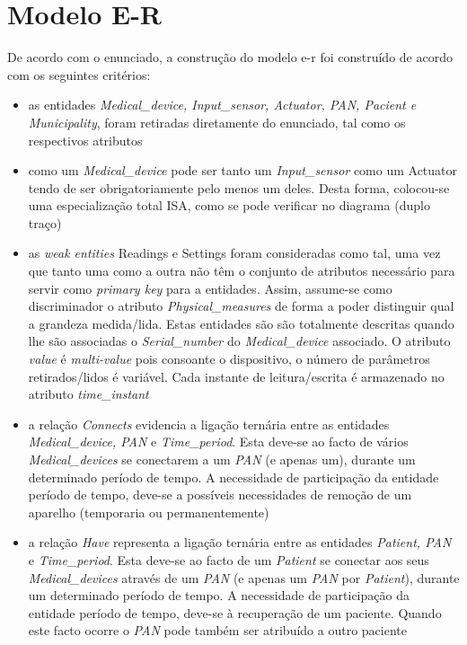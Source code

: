 \documentclass[a4paper]{article}
\begin{document}


\tableofcontents
{}
\pagebreak
{}
\section{Modelo E-R}
De acordo com o enunciado, a construção do modelo e-r foi construído de acordo com os seguintes critérios:
\begin{itemize}

	\item as entidades \textit{Medical\_device, Input\_sensor, Actuator, 
	PAN, Pacient e Municipality}, foram retiradas diretamente do enunciado, tal como os respectivos atributos
	
	\item como um \textit{Medical\_device} pode ser tanto um \textit{Input\_sensor} 
	como um Actuator tendo de ser obrigatoriamente pelo menos um deles.
	Desta forma, colocou-se uma especialização total ISA, como se pode verificar no diagrama (duplo traço)

	\item as \textit{weak entities} Readings e Settings foram consideradas como tal, uma vez que tanto uma como a outra não têm o
	conjunto de atributos necessário para servir como \textit{primary key} para a entidades. Assim, assume-se como discriminador 
	o atributo \textit{Physical\_measures} de forma a poder distinguir qual a grandeza medida/lida. Estas entidades são são totalmente
	descritas quando lhe são associadas o \textit{Serial\_number} do \textit{Medical\_device} associado. O atributo \textit{value} é
	\textit{multi-value} pois consoante o dispositivo, o número de parâmetros retirados/lidos é variável. Cada instante de 
	leitura/escrita é 
	armazenado no atributo \textit{time\_instant}
	
	\item a relação \textit{Connects} evidencia a ligação ternária entre as entidades \textit{Medical\_device, PAN} e 
	\textit{Time\_period}. Esta deve-se ao facto de vários \textit{Medical\_devices} se conectarem a um \textit{PAN} (e apenas um),
	 durante um determinado período de tempo. A necessidade de participação da entidade período de tempo, deve-se a possíveis
	 necessidades de remoção de um aparelho (temporaria ou permanentemente)
	 
	\item a relação \textit{Have} representa a ligação ternária entre as entidades \textit{Patient, PAN} e 
	\textit{Time\_period}. Esta deve-se ao facto de um \textit{Patient} se conectar aos seus \textit{Medical\_devices}
	através de um \textit{PAN} (e apenas um \textit{PAN} por \textit{Patient}),
	 durante um determinado período de tempo. A necessidade de participação da entidade período de tempo, deve-se à recuperação de
	 um paciente. Quando este facto ocorre o \textit{PAN} pode também ser atribuído a outro paciente
	 

\end{itemize}
\end{document}
